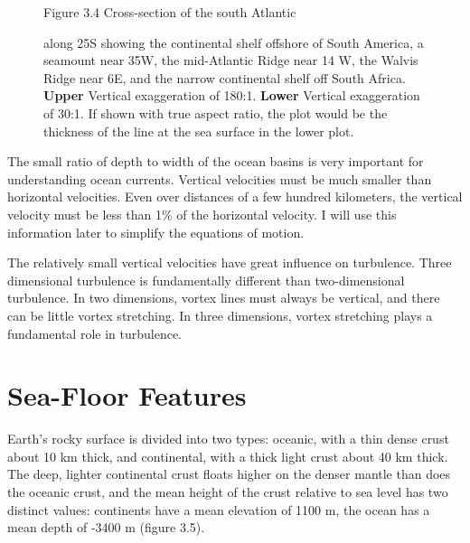 \begin{figure}[t!]
\footnotesize
Figure 3.4 Cross-section of the south Atlantic\rule{0pt}{3ex} along
25\degrees S showing the continental shelf offshore of South America,
a seamount near 35\degrees W, the mid-Atlantic Ridge near 14\degrees
W, the Walvis Ridge near 6\degrees E, and the narrow continental shelf
off South Africa.  \textbf{Upper} Vertical exaggeration of
180:1. \textbf{Lower} Vertical exaggeration of 30:1. If shown with
true aspect ratio, the plot would be the thickness of the line at the
sea surface in the lower plot.
\label{fig:bathy}
\vspace{-4ex}
\end{figure}

The small ratio of depth to width of the ocean basins is very
important for understanding ocean currents. Vertical velocities must
be much smaller than horizontal velocities. Even over distances of a
few hundred kilometers, the vertical velocity must be less than 1\% of
the horizontal velocity. I will use this information later to simplify
the equations of motion.

The relatively small vertical velocities have great influence on
turbulence. Three dimensional turbulence is
fundamentally different than two-dimensional
turbulence. In two dimensions,
vortex lines must always be vertical, and there can be little vortex
stretching. In three dimensions, vortex stretching plays a fundamental
role in turbulence.

\section{Sea-Floor Features}
Earth's rocky surface is divided into two types: oceanic, with a thin
dense crust about 10 km thick, and continental, with a thick light
crust about 40 km thick. The deep, lighter continental crust floats
higher on the denser mantle than does the oceanic crust, and the mean
height of the crust relative to sea level has two distinct values:
continents have a mean elevation of 1100 m, the ocean has a mean depth
of -3400 m (figure 3.5).

